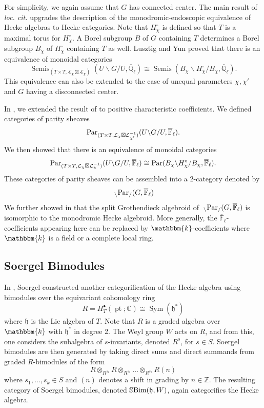 \documentclass{amsart}
\newcommand{\C}{\mathbb{C}}
\newcommand{\Q}{\mathbb{Q}}
\newcommand{\Z}{\mathbb{Z}}
\newcommand{\F}{\mathbb{F}}
\renewcommand{\k}{\mathbbm{k}}
\newcommand{\scrL}{\mathcal{L}}
\DeclareMathOperator{\Semis}{Semis}
\DeclareMathOperator{\Sym}{Sym}
\DeclareMathOperator{\pt}{pt}
\newcommand{\fr}[1]{\mathfrak{#1}}
\newcommand{\UGU}{U \backslash G/U}
\newcommand{\PEE}[2]{\:_{#1 \backslash} \textnormal{Par}_{/ #2} }
\newcommand{\SBim}{\mathbb{S}\textnormal{Bim}}
\theoremstyle{definition}
\numberwithin{equation}{subsection}
\begin{document}
For simplicity, we again assume that $G$ has connected center.
The main result of \emph{loc. cit.} upgrades the description of the monodromic-endoscopic equivalence of Hecke algebras to Hecke categories.
Note that $H_{\chi}^{\circ}$ is defined so that $T$ is a maximal torus for $H_{\chi}^{\circ}$. A Borel subgroup $B$ of $G$ containing $T$ determines a Borel subgroup $B_{\chi}$ of $H_{\chi}^{\circ}$ containing $T$ as well. 
Lusztig and Yun \cite{LY} proved that there is an equivalence of monoidal categories
\[\Semis_{(T \times T, \scrL_{\chi} \boxtimes \scrL_{\chi})} (\UGU, \overline{\Q}_\ell) \cong \Semis (B_{\chi} \backslash H_{\chi}^{\circ} / B_{\chi}, \overline{\Q}_\ell).\]
This equivalence can also be extended to the case of unequal parameters $\chi, \chi'$ and $G$ having a disconnected center.

In \cite{Sandvik}, we extended the result of \cite{LY} to positive characteristic coefficients.
We defined categories of parity sheaves 
\[ \textnormal{Par}_{(T \times T, \scrL_{\chi} \boxtimes \scrL_{\chi'}^{-1} )} (\UGU, \overline{\F}_\ell).\] 
We then showed that there is an equivalence of monoidal categories
\[\textnormal{Par}_{(T \times T, \scrL_{\chi} \boxtimes \scrL_{\chi}^{-1} )} (\UGU, \overline{\F}_\ell) \cong \textnormal{Par} (B_{\chi} \backslash H_{\chi}^{\circ} / B_{\chi}, \overline{\F}_\ell).\]
These categories of parity sheaves can be assembled into a 2-category denoted by
\[\PEE{}{} (G, \overline{\F}_{\ell}) \]
We further showed in \cite[Theorem 3.8.4]{Sandvik} that the split Grothendieck algebroid of $\PEE{}{} (G,  \overline{\F}_{\ell})$ is isomorphic to the monodromic Hecke algebroid.
More generally, the $\overline{\F}_{\ell}$-coefficients appearing here can be replaced by $\k$-coefficients where $\k$ is a field or a complete local ring. 

\subsection{Soergel Bimodules}

In \cite{So90, So92, So00}, Soergel constructed another categorification of the Hecke algebra using bimodules over the equivariant cohomology ring
\[R = H_T^{\bullet} (\pt; \C) \cong \Sym (\fr{h}^*)\]
where $\fr{h}$ is the Lie algebra of $T$. Note that $R$ is a graded algebra over $\k$ with $\fr{h}^*$ in degree 2.
The Weyl group $W$ acts on $R$, and from this, one considers the subalgebra of $s$-invariants, denoted $R^s$, for $s \in S$.
Soergel bimodules are then generated by taking direct sums and direct summands from graded $R$-bimodules of the form
\[R \otimes_{R^{s_1}} R \otimes_{R^{s_2}} \ldots \otimes_{R^{s_k}} R (n)\]
where $s_1, \ldots, s_k \in S$ and $(n)$ denotes a shift in grading by $n \in \Z$.
The resulting category of Soergel bimodules, denoted $\SBim (\fr{h}, W)$, again categorifies the Hecke algebra.
\end{document}
